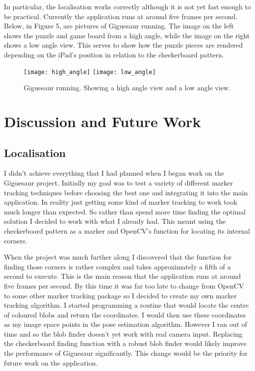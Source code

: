 \documentclass{article}
\begin{document}
In particular, the localisation works correctly although it is not yet fast enough to be practical. Currently the application runs at around five frames per second. Below, in Figure 5, are pictures of Giguesaur running. The image on the left shows the puzzle and game board from a high angle, while the image on the right shows a low angle view. This serves to show how the puzzle pieces are rendered depending on the iPad's position in relation to the checkerboard pattern. 


\begin{figure}[H]
\begin{center}
\texttt{[image: high\_angle]}
\texttt{[image: low\_angle]}
\caption{Giguesaur running. Showing a high angle view and a low angle view. }
\end{center}
\end{figure}


\section{Discussion and Future Work}

\subsection{Localisation}
I didn't achieve everything that I had planned when I began work on the Giguesaur project. Initially my goal was to test a variety of different marker tracking techniques before choosing the best one and integrating it into the main application. In reality just getting some kind of marker tracking to work took much longer than expected. So rather than spend more time finding the optimal solution I decided to work with what I already had. This meant using the checkerboard pattern as a marker and OpenCV's function for locating its internal corners. 

When the project was much further along I discovered that the function for finding those corners is rather complex and takes approximately a fifth of a second to execute. This is the main reason that the application runs at around five frames per second. By this time it was far too late to change from OpenCV to some other marker tracking package so I decided to create my own marker tracking algorithm. I started programming a routine that would locate the centre of coloured blobs and return the coordinates. I would then use these coordinates as my image space points in the pose estimation algorithm. However I ran out of time and so the blob finder doesn't yet work with real camera input. Replacing the checkerboard finding function with a robust blob finder would likely improve the performance of Giguesaur significantly. This change would be the priority for future work on the application. 
\end{document}
